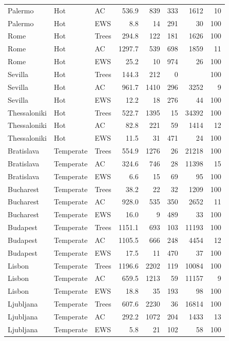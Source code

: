 \begin{longtable}{lllrrrrr}
  Palermo & Hot & AC & 536.9 & 839 & 333 & 1612 & 10 \\ 
  Palermo & Hot & EWS & 8.8 & 14 & 291 & 30 & 100 \\ 
  Rome & Hot & Trees & 294.8 & 122 & 181 & 1626 & 100 \\ 
  Rome & Hot & AC & 1297.7 & 539 & 698 & 1859 & 11 \\ 
  Rome & Hot & EWS & 25.2 & 10 & 974 & 26 & 100 \\ 
  Sevilla & Hot & Trees & 144.3 & 212 & 0 &  & 100 \\ 
  Sevilla & Hot & AC & 961.7 & 1410 & 296 & 3252 & 9 \\ 
  Sevilla & Hot & EWS & 12.2 & 18 & 276 & 44 & 100 \\ 
  Thessaloniki & Hot & Trees & 522.7 & 1395 & 15 & 34392 & 100 \\ 
  Thessaloniki & Hot & AC & 82.8 & 221 & 59 & 1414 & 12 \\ 
  Thessaloniki & Hot & EWS & 11.5 & 31 & 471 & 24 & 100 \\ 
  Bratislava & Temperate & Trees & 554.9 & 1276 & 26 & 21218 & 100 \\ 
  Bratislava & Temperate & AC & 324.6 & 746 & 28 & 11398 & 15 \\ 
  Bratislava & Temperate & EWS & 6.6 & 15 & 69 & 95 & 100 \\ 
  Bucharest & Temperate & Trees & 38.2 & 22 & 32 & 1209 & 100 \\ 
  Bucharest & Temperate & AC & 928.0 & 535 & 350 & 2652 & 11 \\ 
  Bucharest & Temperate & EWS & 16.0 & 9 & 489 & 33 & 100 \\ 
  Budapest & Temperate & Trees & 1151.1 & 693 & 103 & 11193 & 100 \\ 
  Budapest & Temperate & AC & 1105.5 & 666 & 248 & 4454 & 12 \\ 
  Budapest & Temperate & EWS & 17.5 & 11 & 470 & 37 & 100 \\ 
  Lisbon & Temperate & Trees & 1196.6 & 2202 & 119 & 10084 & 100 \\ 
  Lisbon & Temperate & AC & 659.5 & 1213 & 59 & 11157 & 9 \\ 
  Lisbon & Temperate & EWS & 18.8 & 35 & 193 & 98 & 100 \\ 
  Ljubljana & Temperate & Trees & 607.6 & 2230 & 36 & 16814 & 100 \\ 
  Ljubljana & Temperate & AC & 292.2 & 1072 & 204 & 1433 & 13 \\ 
  Ljubljana & Temperate & EWS & 5.8 & 21 & 102 & 58 & 100 \\ 

\end{longtable}
